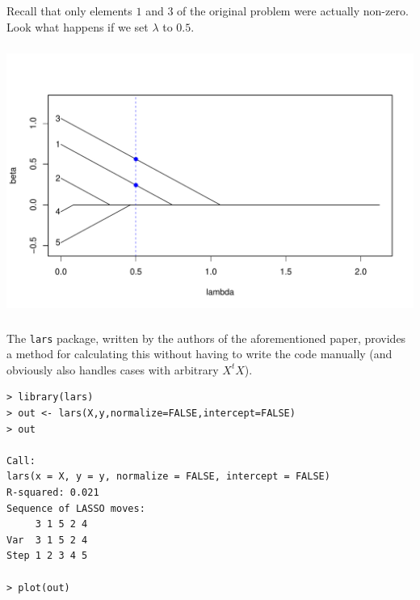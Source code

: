 \begin{frame}[fragile] \frametitle{}

Recall that only elements $1$ and $3$ of the original
problem were actually non-zero. Look what happens if
we set $\lambda$ to $0.5$.

\end{frame}

\begin{frame}[fragile] \frametitle{}

\begin{center}
\includegraphics[width=\textwidth]{img/fig05.pdf}
\end{center}

\end{frame}

\begin{frame}[fragile] \frametitle{}

The \texttt{lars} package, written by the authors of
the aforementioned paper, provides a method for calculating
this without having to write the code manually (and obviously
also handles cases with arbitrary $X^tX$).
\begin{verbatim}
> library(lars)
> out <- lars(X,y,normalize=FALSE,intercept=FALSE)
> out

Call:
lars(x = X, y = y, normalize = FALSE, intercept = FALSE)
R-squared: 0.021
Sequence of LASSO moves:
     3 1 5 2 4
Var  3 1 5 2 4
Step 1 2 3 4 5

> plot(out)
\end{verbatim}


\end{frame}

